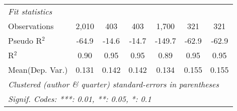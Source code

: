 \begin{tabular}{lcccccc}
   \midrule
   \emph{Fit statistics}\\
   Observations            & 2,010   & 403     & 403          & 1,700   & 321     & 321\\  
   Pseudo R$^2$            & -64.9   & -14.6   & -14.7        & -149.7  & -62.9   & -62.9\\  
   R$^2$                   & 0.90    & 0.95    & 0.95         & 0.89    & 0.95    & 0.95\\  
Mean(Dep. Var.) & 0.131 & 0.142 & 0.142 & 0.134 & 0.155 & 0.155 \\
   \midrule \midrule
   \multicolumn{7}{l}{\emph{Clustered (author \& quarter) standard-errors in parentheses}}\\
   \multicolumn{7}{l}{\emph{Signif. Codes: ***: 0.01, **: 0.05, *: 0.1}}\\
\end{tabular}
\par\endgroup
